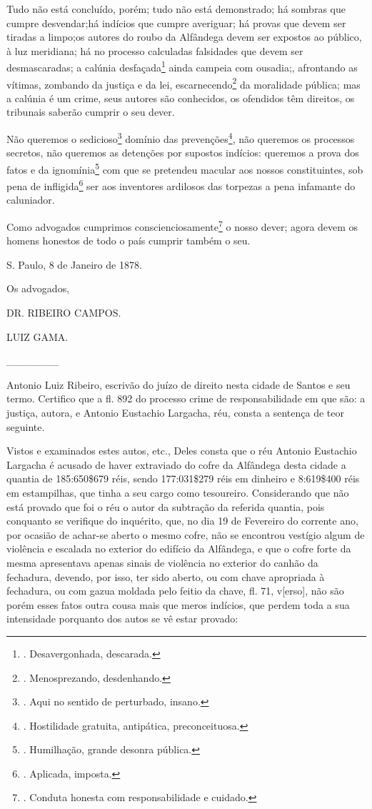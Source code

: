 Tudo não está concluído, porém; tudo não está demonstrado; há sombras
que cumpre desvendar;há indícios que cumpre averiguar; há provas que
devem ser tiradas a limpo;os autores do roubo da Alfândega devem ser
expostos ao público, à luz meridiana; há no processo calculadas
falsidades que devem ser desmascaradas; a calúnia desfaçada\footnote{.
  Desavergonhada, descarada.} ainda campeia com ousadia;, afrontando as
vítimas, zombando da justiça e da lei, escarnecendo\footnote{.
  Menosprezando, desdenhando.} da moralidade pública; mas a calúnia é um
crime, seus autores são conhecidos, os ofendidos têm direitos, os
tribunais saberão cumprir o seu dever.

Não queremos o sedicioso\footnote{. Aqui no sentido de perturbado,
  insano.} domínio das prevenções\footnote{. Hostilidade gratuita,
  antipática, preconceituosa.}, não queremos os processos secretos, não
queremos as detenções por supostos indícios: queremos a prova dos fatos
e da ignomínia\footnote{. Humilhação, grande desonra pública.} com que
se pretendeu macular aos nossos constituintes, sob pena de
infligida\footnote{. Aplicada, imposta.} ser aos inventores ardilosos
das torpezas a pena infamante do caluniador.

Como advogados cumprimos conscienciosamente\footnote{. Conduta honesta
  com responsabilidade e cuidado.} o nosso dever; agora devem os homens
honestos de todo o país cumprir também o seu.

S. Paulo, 8 de Janeiro de 1878.

Os advogados,

DR. RIBEIRO CAMPOS.

LUIZ GAMA.

\_\_\_\_\_\_\_

Antonio Luiz Ribeiro, escrivão do juízo de direito nesta cidade de
Santos e seu termo. Certifico que a fl. 892 do processo crime de
responsabilidade em que são: a justiça, autora, e Antonio Eustachio
Largacha, réu, consta a sentença de teor seguinte.

Vistos e examinados estes autos, etc., Deles consta que o réu Antonio
Eustachio Largacha é acusado de haver extraviado do cofre da Alfândega
desta cidade a quantia de 185:650\$679 réis, sendo 177:031\$279 réis em
dinheiro e 8:619\$400 réis em estampilhas, que tinha a seu cargo como
tesoureiro. Considerando que não está provado que foi o réu o autor da
subtração da referida quantia, pois conquanto se verifique do inquérito,
que, no dia 19 de Fevereiro do corrente ano, por ocasião de achar-se
aberto o mesmo cofre, não se encontrou vestígio algum de violência e
escalada no exterior do edifício da Alfândega, e que o cofre forte da
mesma apresentava apenas sinais de violência no exterior do canhão da
fechadura, devendo, por isso, ter sido aberto, ou com chave apropriada à
fechadura, ou com gazua moldada pelo feitio da chave, fl. 71,
v{[}erso{]}, não são porém esses fatos outra cousa mais que meros
indícios, que perdem toda a sua intensidade porquanto dos autos se vê
estar provado:

